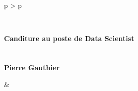 \documentclass[cv]{cv_style}
\begin{document}
{
\begin{tabular}{p{\topbarleftsize\textwidth} > {\arraybackslash}p{\topbarrightsize\textwidth}}
 \vspace{1cm}\\
    \vspace{-.2cm}
    \begin{minipage}[t]{\topbarleftsize\textwidth}
        \vspace{-.1cm} \\
        \begin{minipage}{\textwidth}
                \Large
                \textbf{\color{blue2}Canditure au poste de Data Scientist\\
            }\\
                \vspace{-0.8cm} \\
                {\textbf{Pierre \hspace{.1cm}Gauthier}}
        \end{minipage}
    \end{minipage}

    & %


\end{tabular}}
\end{document}
